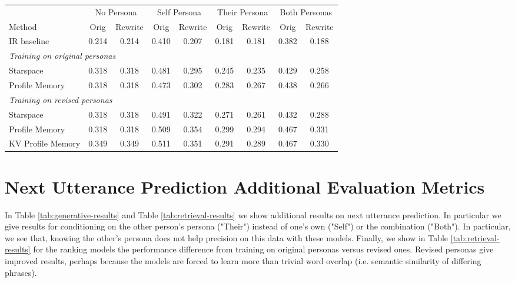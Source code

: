 \documentclass[11pt,a4paper]{article}
\begin{document}
\begin{table*}[t]
  \begin{center}
\begin{tabular}{l|cc|cc|cc|cc }
      \toprule
      ~&  \multicolumn{2}{c}{No Persona} & \multicolumn{2}{|c}{Self Persona} & \multicolumn{2}{|c}{Their Persona} & \multicolumn{2}{|c}{Both Personas} \\ 
      Method & Orig & Rewrite & Orig & Rewrite & Orig & Rewrite & Orig & Rewrite \\ 
      \midrule
      IR baseline  &0.214 & 0.214 & 0.410 & 0.207  &  0.181  & 0.181 & 0.382& 0.188 \\
      \multicolumn{8}{l}{{\em Training on original personas}}\\
      Starspace    & 0.318 & 0.318 &  0.481  & 0.295& 0.245 & 0.235 & 0.429 & 0.258\\
      Profile Memory        &  0.318 & 0.318 & 0.473 & 0.302 & 0.283 & 0.267 & 0.438 & 0.266\\    
      \multicolumn{8}{l}{{\em Training on revised personas}}\\
      Starspace    &  0.318 & 0.318 & 0.491 & 0.322 & 0.271 & 0.261 & 0.432 & 0.288\\
      Profile Memory        &  0.318 & 0.318 & 0.509 & 0.354 & 0.299 & 0.294 & 0.467 & 0.331\\
      KV Profile Memory     &  0.349 & 0.349 & 0.511 & 0.351 & 0.291 &  0.289      &          0.467 &  0.330 \\
      \bottomrule
      \end{tabular}
\caption{{\bf Evaluation of dialog utterance prediction with ranking models} using hits@1 in four settings: conditioned on the speakers persona ("self persona"), the dialogue partner's persona ("their persona"), both or none. The personas are either the original source given to Turkers to condition the dialogue, or the rewritten personas that do not have word overlap, explaining the poor performance of IR in that case. }
      \label{tab:retrieval-results}
  \end{center}
\end{table*}

\section{Next Utterance Prediction Additional Evaluation Metrics}

In Table \ref{tab:generative-results} and Table \ref{tab:retrieval-results} we show additional results on next utterance prediction.
In particular we give results for conditioning on the other person's persona ("Their") instead of one's own ("Self") or the combination ("Both"). In particular, we see that, knowing the other's persona does not help precision on this data with these models. Finally, we show in  Table \ref{tab:retrieval-results} for the ranking models the performance difference from training on original personas versus revised ones. Revised personas give improved results, perhaps because the models are forced to learn more than trivial word overlap (i.e. semantic similarity of differing phrases).
\end{document}
